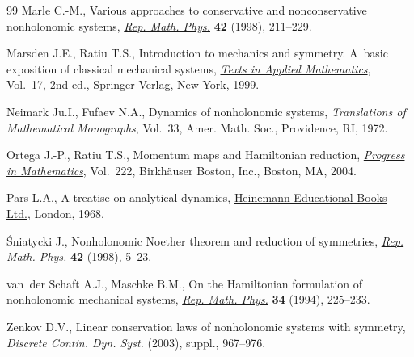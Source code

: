 \documentclass[10pt,a4paper]{amsart}
\numberwithin{equation}{section}
\begin{document}
\begin{thebibliography}{99}
Marle C.-M., Various approaches to conservative and nonconservative nonholonomic
  systems, \href{http://dx.doi.org/10.1016/S0034-4877(98)80011-6}{\textit{Rep. Math. Phys.}} \textbf{42} (1998), 211--229.

Marsden J.E., Ratiu T.S., Introduction to mechanics and symmetry. A~basic
  exposition of classical mechanical systems, \href{http://dx.doi.org/10.1007/978-0-387-21792-5}{\textit{Texts in Applied
  Mathematics}}, Vol.~17, 2nd ed., Springer-Verlag, New York, 1999.

Neimark Ju.I., Fufaev N.A., Dynamics of nonholonomic systems,
  \textit{Translations of Mathematical Monographs}, Vol.~33, Amer. Math. Soc.,
  Providence, RI, 1972.

Ortega J.-P., Ratiu T.S., Momentum maps and {H}amiltonian reduction,
  \href{http://dx.doi.org/10.1007/978-1-4757-3811-7}{\textit{Progress in Mathematics}}, Vol.~222, Birkh\"auser Boston, Inc.,
  Boston, MA, 2004.

Pars L.A., A treatise on analytical dynamics, \href{http://dx.doi.org/10.1007/978-1-4757-3811-7}{Heinemann Educational Books Ltd.},
  London, 1968.

{\'S}niatycki J., Nonholonomic {N}oether theorem and reduction of symmetries,
  \href{http://dx.doi.org/10.1016/S0034-4877(98)80002-5}{\textit{Rep. Math. Phys.}} \textbf{42} (1998), 5--23.

van~der Schaft A.J., Maschke B.M., On the {H}amiltonian formulation of
  nonholonomic mechanical systems, \href{http://dx.doi.org/10.1016/0034-4877(94)90038-8}{\textit{Rep. Math. Phys.}} \textbf{34}
  (1994), 225--233.

Zenkov D.V., Linear conservation laws of nonholonomic systems with symmetry,
  \textit{Discrete Contin. Dyn. Syst.}  (2003), suppl., 967--976.

\end{thebibliography}
\end{document}
